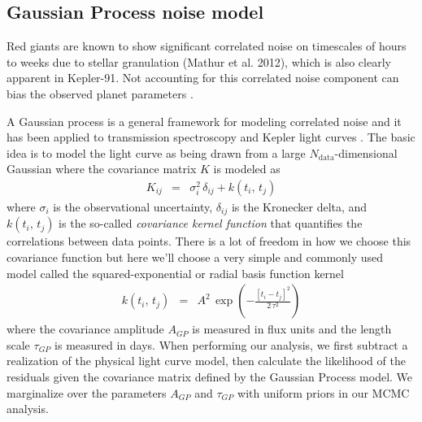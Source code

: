 \documentclass[apjl]{emulateapj}
\begin{document}
\subsection{Gaussian Process noise model}
Red giants are known to show significant correlated noise on timescales of hours to weeks due to stellar granulation (Mathur et al. 2012), which is also clearly apparent in Kepler-91. Not accounting for this correlated noise component can bias the observed planet parameters \citep{carter09}.

A Gaussian process is a general framework for modeling correlated noise
\citep{rasmussen} and it has been applied to transmission spectroscopy
\citep{gibson-gp,evans-gp} and Kepler light curves \citep[][Dawson
\emph{et al.}\ in press]{ambikasaran14}.
The basic idea is to model the light curve as being drawn from a large
$N_\mathrm{data}$-dimensional Gaussian where the covariance matrix $K$ is
modeled as
\begin{eqnarray}
K_{ij} &=& \sigma_i^2\,\delta_{ij} + k(t_i,\,t_j)
\end{eqnarray}
where $\sigma_i$ is the observational uncertainty, $\delta_{ij}$ is the
Kronecker delta, and $k(t_i,\,t_j)$ is the so-called \emph{covariance kernel
function} that quantifies the correlations between data points.
There is a lot of freedom in how we choose this covariance function but here
we'll choose a very simple and commonly used model called the
squared-exponential or radial basis function kernel
\begin{eqnarray}
k(t_i,\,t_j) &=& A^2\,\exp\left(-\frac{[t_i-t_j]^2}{2\,\tau^2}\right)
\end{eqnarray}
where the covariance amplitude $A_{GP}$ is measured in flux units and the length
scale $\tau_{GP}$ is measured in days.
When performing our analysis, we first subtract a realization of the physical light curve model, then calculate the likelihood of the residuals given the covariance matrix defined by the Gaussian Process model. We marginalize over the parameters $A_{GP}$ and $\tau_{GP}$ with uniform priors in our MCMC analysis.
\end{document}
